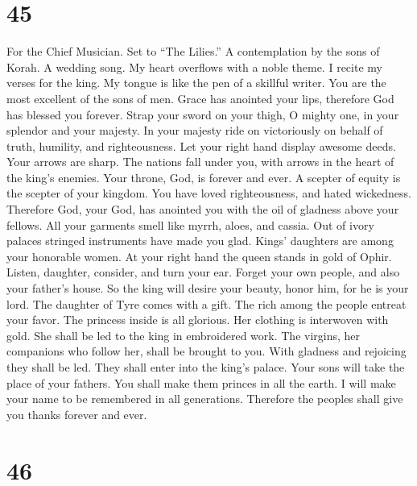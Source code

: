 \hypertarget{section-44}{%
\section{45}\label{section-44}}

For the Chief Musician. Set to ``The Lilies.'' A contemplation by the
sons of Korah. A wedding song.  My heart overflows with a
noble theme. I recite my verses for the king. My tongue is like the pen
of a skillful writer.  You are the most excellent of the
sons of men. Grace has anointed your lips, therefore God has blessed you
forever.  Strap your sword on your thigh, O mighty one, in
your splendor and your majesty.  In your majesty ride on
victoriously on behalf of truth, humility, and righteousness. Let your
right hand display awesome deeds.  Your arrows are sharp.
The nations fall under you, with arrows in the heart of the king's
enemies.  Your throne, God, is forever and ever. A scepter
of equity is the scepter of your kingdom.  You have loved
righteousness, and hated wickedness. Therefore God, your God, has
anointed you with the oil of gladness above your fellows. 
All your garments smell like myrrh, aloes, and cassia. Out of ivory
palaces stringed instruments have made you glad.  Kings'
daughters are among your honorable women. At your right hand the queen
stands in gold of Ophir.  Listen, daughter, consider, and
turn your ear. Forget your own people, and also your father's house.
 So the king will desire your beauty, honor him, for he is
your lord.  The daughter of Tyre comes with a gift. The
rich among the people entreat your favor.  The princess
inside is all glorious. Her clothing is interwoven with gold.
 She shall be led to the king in embroidered work. The
virgins, her companions who follow her, shall be brought to you.
 With gladness and rejoicing they shall be led. They shall
enter into the king's palace.  Your sons will take the
place of your fathers. You shall make them princes in all the earth.
 I will make your name to be remembered in all generations.
Therefore the peoples shall give you thanks forever and ever.

\hypertarget{section-45}{%
\section{46}\label{section-45}}

